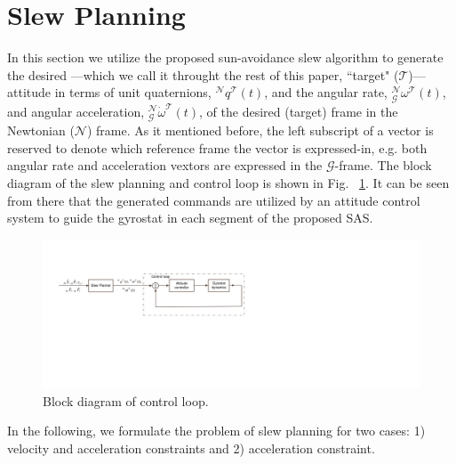 \documentclass[journal ]{new-aiaa}
\begin{document}
	
	\section{Slew Planning} 
	{In this section we utilize the proposed sun-avoidance slew algorithm to generate the desired ---which we call it throught the rest of this paper, ``target" ($\mathcal{T}$)---attitude in terms of unit quaternions, $^\mathcal{N}q^\mathcal{T}(t)$, and the angular rate,  $_\mathcal{G}^\mathcal{N}\omega^\mathcal{T}(t)$, and angular acceleration, $_\mathcal{G}^\mathcal{N}\dot{\omega}^\mathcal{T}(t)$, of the desired (target) frame in the Newtonian ($\mathcal{N}$) frame. As it mentioned before, the left subscript of a vector is reserved to denote which reference frame the vector is expressed-in, e.g. both angular rate and acceleration vextors are expressed in the $\mathcal{G}$-frame.} The block diagram of the slew planning and control  loop is shown in Fig. ~\ref{guidance_loop}. It can be seen from there that the generated commands are utilized by an attitude control system to guide the gyrostat in each segment of the proposed SAS.
		\begin{figure}[h!]
		\centering
			\includegraphics[width=4.5in]{guidance_loop}  
			\caption{Block diagram of control loop. }
			\label{guidance_loop}
	\end{figure}	
	
In the following, we formulate the problem of slew planning for two cases: 1) velocity and acceleration constraints and 2) acceleration constraint.
\end{document}
